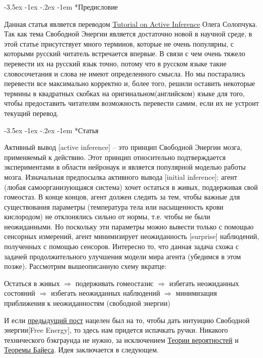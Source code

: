 \documentclass[twoside,leqno, 11pt]{article}
\author{Махнева Елизавета, Брсикян Бабкен \\ БЭК171}
\makeatletter
\renewcommand\section{\@startsection{section}{1}{\z@}%
        {-3.5ex \@plus -1ex \@minus -.2ex}%
        {-1em}%
        {\normalfont\large\scshape\bfseries}}
\makeatother
\begin{document}
	
\section*{Предисловие}~\

	Данная статья является переводом \href{https://medium.com/@solopchuk/tutorial-on-active-inference-30edcf50f5dc}{Tutorial on Active Inference} Олега Солопчука. Так как тема Свободной Энергии является достаточно новой в научной среде, в этой статье присутствует много терминов, которые не очень популярны, с которыми русский читатель встречается впервые. В связи с чем очень тяжело перевести их на русский язык точно, потому что в русском языке такие словосочетания и слова не имеют определенного смысла. Но мы постарались перевести все максимально корректно и, более того, решили оставить некоторые термины в квадратных скобках на оригинальном(английском) языке для того, чтобы предоставить читателям возможность перевести самим, если их не устроит текущий перевод.

\section*{Статья}~\

	Активный вывод [active inference] -- это принцип Свободной Энергии мозга, применяемый к действию. Этот принцип относительно подтверждается экспериментами в области нейронаук и является популярной моделью работы мозга. Изначальная предпосылка активного вывода [initial inference]: агент (любая самоорганизующаяся система) хочет остаться в живых, поддерживая свой гомеостаз. В конце концов, агент должен следить за тем, чтобы важные для существования параметры (температура тела или насыщенность крови кислородом) не отклонялись сильно от нормы, т.е. чтобы не были неожиданными. Но поскольку эти параметры можно вывести только с помощью сенсорных измерений, агент минимизирует неожиданность [surprise] наблюдений, полученных с помощью сенсоров. Интересно то, что данная задача схожа с задачей продолжительного улучшения модели мира агента (убедимся в этом позже). Рассмотрим вышеописанную схему вкратце:
	
\begin{center}
	Остаться в живых $\Rightarrow$ подерживать гомеостазис $\Rightarrow$ избегать неожиданных состояний $\Rightarrow$ избегать неожиданных наблюдений $\Rightarrow$ минимизация приближения к неожиданностям (свободной энергии)
\end{center}
	
	И если \href{https://medium.com/@solopchuk/intuitions-on-predictive-coding-and-the-free-energy-principle-3fc5bcedc754}{предыдущий пост} нацелен был на то, чтобы дать интуицию Свободной энергии[Free Energy], то здесь нам придется испачкать ручки. Никакого технического бэкграунда не нужно, за исключением \href{https://www.mathsisfun.com/data/probability.html}{Теории вероятностей} и \href{https://www.mathsisfun.com/data/bayes-theorem.html}{Теоремы Байеса}. Идея заключается в следующем.
\end{document}
